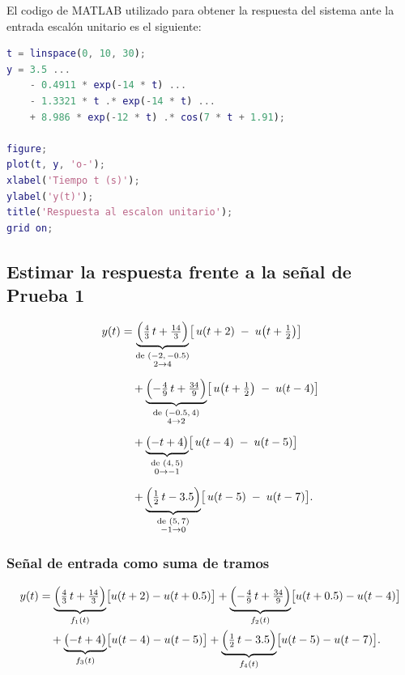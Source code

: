 \documentclass[11pt,letterpaper]{article}
\begin{document}
\newpage
El codigo de MATLAB utilizado para obtener la respuesta del sistema ante la entrada escalón unitario es el siguiente:
\begin{lstlisting}[language=Matlab, caption={Respuesta al escalón unitario del sistema ajustado}]
% Se define la funcion de transferencia ajustada de forma directa.
t = linspace(0, 10, 30);
y = 3.5 ...
    - 0.4911 * exp(-14 * t) ...
    - 1.3321 * t .* exp(-14 * t) ...
    + 8.986 * exp(-12 * t) .* cos(7 * t + 1.91);

figure;
plot(t, y, 'o-');
xlabel('Tiempo t (s)');
ylabel('y(t)');
title('Respuesta al escalon unitario');
grid on;
\end{lstlisting}

\subsection{Estimar la respuesta frente a la señal de Prueba 1}

\begin{equation}
\begin{aligned}
y(t) &= \underbrace{\Bigl(\tfrac{4}{3}\,t + \tfrac{14}{3}\Bigr)}_{\substack{\text{de }(-2,\, -0.5)\\2\to4}} 
\bigl[\,u(t+2)\;-\;u\bigl(t+\tfrac12\bigr)\bigr] \\[6pt]
&\quad{}+\underbrace{\Bigl(-\tfrac{4}{9}\,t + \tfrac{34}{9}\Bigr)}_{\substack{\text{de }(-0.5,\,4)\\4\to2}}
\bigl[\,u\bigl(t+\tfrac12\bigr)\;-\;u(t-4)\bigr] \\[6pt]
&\quad{}+\underbrace{\bigl(-t + 4\bigr)}_{\substack{\text{de }(4,\,5)\\0\to-1}}
\bigl[\,u(t-4)\;-\;u(t-5)\bigr] \\[6pt]
&\quad{}+\underbrace{\Bigl(\tfrac12\,t - 3.5\Bigr)}_{\substack{\text{de }(5,\,7)\\-1\to0}}
\bigl[\,u(t-5)\;-\;u(t-7)\bigr].
\end{aligned}
\end{equation}

\subsubsection{Señal de entrada como suma de tramos}

\begin{align}
y(t)&=
\underbrace{\Bigl(\tfrac{4}{3}\,t+\tfrac{14}{3}\Bigr)}_{f_1(t)}
\bigl[u(t+2)-u(t+0.5)\bigr]
+
\underbrace{\Bigl(-\tfrac{4}{9}\,t+\tfrac{34}{9}\Bigr)}_{f_2(t)}
\bigl[u(t+0.5)-u(t-4)\bigr]
\label{eq:y1}\\
&\quad+
\underbrace{\bigl(-t+4\bigr)}_{f_3(t)}
\bigl[u(t-4)-u(t-5)\bigr]
+
\underbrace{\Bigl(\tfrac12\,t-3.5\Bigr)}_{f_4(t)}
\bigl[u(t-5)-u(t-7)\bigr].
\label{eq:y2}
\end{align}
\end{document}
